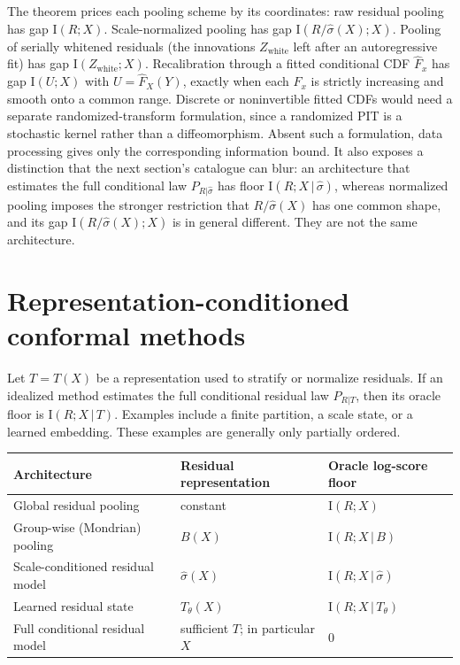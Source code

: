 \documentclass[11pt]{article}
\theoremstyle{remark}
\newcommand{\I}{\mathrm{I}}
\newcommand{\given}{\,|\,}
\begin{document}
The theorem prices each pooling scheme by its coordinates: raw residual pooling has gap
$\I(R;X)$. Scale-normalized pooling has gap $\I(R/\hat\sigma(X);X)$. Pooling of
serially whitened residuals (the innovations $Z_{\mathrm{white}}$ left after an
autoregressive fit) has gap $\I(Z_{\mathrm{white}};X)$. Recalibration through a fitted
conditional CDF $\widehat F_x$ has gap $\I(U;X)$ with $U=\widehat F_X(Y)$, exactly when each
$\widehat F_x$ is strictly increasing and smooth onto a common range. Discrete or
noninvertible fitted CDFs would need a separate randomized-transform formulation, since a
randomized PIT is a stochastic kernel rather than a diffeomorphism. Absent such a
formulation, data processing gives only the corresponding information bound. It also exposes a
distinction that the next section's catalogue can blur: an architecture that estimates the full
conditional law $P_{R|\hat\sigma}$ has floor $\I(R;X\given\hat\sigma)$, whereas normalized
pooling imposes the stronger restriction that $R/\hat\sigma(X)$ has one common shape, and its
gap $\I(R/\hat\sigma(X);X)$ is in general different. They are not the same architecture.

\section{Representation-conditioned conformal methods}\label{sec:catalogue}

Let $T=T(X)$ be a representation used to stratify or normalize residuals. If an idealized method
estimates the full conditional residual law $P_{R|T}$, then its oracle floor is
$\I(R;X\given T)$. Examples include a finite partition, a scale state, or a learned embedding.
These examples are generally only partially ordered.

\begin{center}
\begin{tabular}{lll}
\toprule
Architecture & Residual representation & Oracle log-score floor\\
\midrule
Global residual pooling & constant & $\I(R;X)$\\
Group-wise (Mondrian) pooling & $B(X)$ & $\I(R;X\given B)$\\
Scale-conditioned residual model & $\hat\sigma(X)$ & $\I(R;X\given\hat\sigma)$\\
Learned residual state & $T_\theta(X)$ & $\I(R;X\given T_\theta)$\\
Full conditional residual model & sufficient $T$; in particular $X$ & $0$\\
\bottomrule
\end{tabular}
\end{center}
\end{document}
